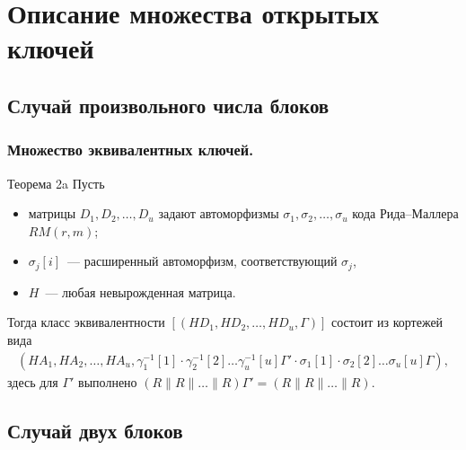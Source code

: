 
\section[Описание открытых ключей]{Описание множества открытых ключей}

\subsection[Произвольное число блоков]{Случай произвольного числа блоков}

\begin{frame}
  \frametitle{Множество эквивалентных ключей.}
\begin{block}{Теорема 2a}
Пусть
\begin{itemize}
\item матрицы $D_1,D_2,\ldots, D_u$ задают автоморфизмы $\sigma_1,\sigma_2,\ldots,\sigma_u$ кода Рида--Маллера $RM(r,m)$;
\item $\sigma_j[i]$~--- расширенный автоморфизм, соответствующий $\sigma_j$,
\item $H$~--- любая невырожденная матрица.
\end{itemize}
Тогда класс эквивалентности $[(HD_1,HD_2,\ldots,HD_u,\Gamma)]$ состоит из кортежей вида
\begin{eqnarray*}
(HA_1,HA_2,\ldots,HA_u,\gamma^{-1}_1[1]\cdot\gamma^{-1}_2[2]\ldots
\gamma^{-1}_u[u]\Gamma'
\cdot\sigma_1[1]\cdot\sigma_2[2]\ldots\sigma_u[u]\Gamma),
\end{eqnarray*}
здесь для $\Gamma'$ выполнено $(R\|R\|\ldots\|R)\Gamma'=(R\|R\|\ldots\|R).$
\end{block}
\end{frame}

\subsection[Два блока]{Случай двух блоков}

